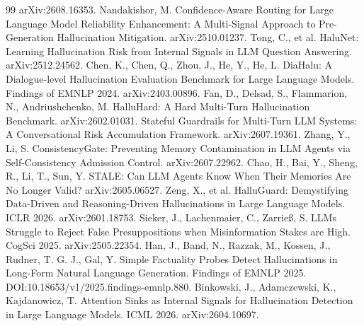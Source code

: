 \documentclass[conference,a4paper]{IEEEtran}
\begin{document}
\begin{thebibliography}{99}
arXiv:2608.16353.
 Nandakishor, M.
Confidence-Aware Routing for Large Language Model Reliability Enhancement:
A Multi-Signal Approach to Pre-Generation Hallucination Mitigation.
arXiv:2510.01237.
 Tong, C., et al. HaluNet: Learning
Hallucination Risk from Internal Signals in LLM Question Answering.
arXiv:2512.24562.
 Chen, K., Chen, Q., Zhou, J., He, Y.,
He, L. DiaHalu: A Dialogue-level Hallucination Evaluation Benchmark for
Large Language Models. Findings of EMNLP 2024. arXiv:2403.00896.
 Fan, D., Delsad, S., Flammarion, N.,
Andriushchenko, M. HalluHard: A Hard Multi-Turn Hallucination Benchmark.
arXiv:2602.01031.
 Stateful Guardrails
for Multi-Turn LLM Systems: A Conversational Risk Accumulation Framework.
arXiv:2607.19361.
 Zhang, Y., Li, S.
ConsistencyGate: Preventing Memory Contamination in LLM Agents via
Self-Consistency Admission Control. arXiv:2607.22962.
 Chao, H., Bai, Y., Sheng, R., Li, T.,
Sun, Y. STALE: Can LLM Agents Know When Their Memories Are No Longer
Valid? arXiv:2605.06527.
 Zeng, X., et al. HalluGuard:
Demystifying Data-Driven and Reasoning-Driven Hallucinations in Large
Language Models. ICLR 2026. arXiv:2601.18753.
 Sieker, J., Lachenmaier, C.,
Zarrie{\ss}, S. LLMs Struggle to Reject False Presuppositions when
Misinformation Stakes are High. CogSci 2025. arXiv:2505.22354.
 Han, J., Band, N., Razzak, M., Kossen,
J., Rudner, T. G. J., Gal, Y. Simple Factuality Probes Detect Hallucinations
in Long-Form Natural Language Generation. Findings of EMNLP 2025.
DOI:10.18653/v1/2025.findings-emnlp.880.
 Binkowski, J., Adamczewski,
K., Kajdanowicz, T. Attention Sinks as Internal Signals for Hallucination
Detection in Large Language Models. ICML 2026. arXiv:2604.10697.
\end{thebibliography}
\end{document}
